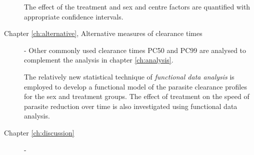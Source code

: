 \begin{description}
The effect of the treatment and sex and centre factors are quantified with appropriate confidence intervals.
\item[Chapter \ref{ch:alternative}, Alternative measures of clearance times] - Other commonly used clearance times PC50 and PC99 are analysed to complement the analysis in chapter \ref{ch:analysis}.

The relatively new statistical technique of \emph{functional data analysis} is employed to develop a functional model of the parasite clearance profiles for the sex and treatment groups. The effect of treatment on the speed of parasite reduction over time is also investigated using functional data analysis. 
 
\item[Chapter \ref{ch:discussion}] - 

\end{description}
